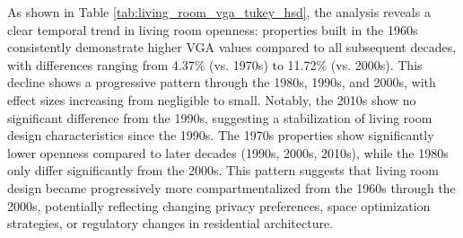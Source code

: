 As shown in Table \ref{tab:living_room_vga_tukey_hsd}, the analysis reveals a clear temporal trend in living room openness: properties built in the 1960s 
consistently demonstrate higher VGA values compared to all subsequent decades, with differences ranging 
from 4.37\% (vs. 1970s) to 11.72\% (vs. 2000s). This decline shows a progressive pattern through the 
1980s, 1990s, and 2000s, with effect sizes increasing from negligible to small. Notably, the 2010s 
show no significant difference from the 1990s, suggesting a stabilization of living room design 
characteristics since the 1990s. The 1970s properties show significantly lower openness compared to 
later decades (1990s, 2000s, 2010s), while the 1980s only differ significantly from the 2000s. This 
pattern suggests that living room design became progressively more compartmentalized from the 1960s 
through the 2000s, potentially reflecting changing privacy preferences, space optimization strategies, 
or regulatory changes in residential architecture.


